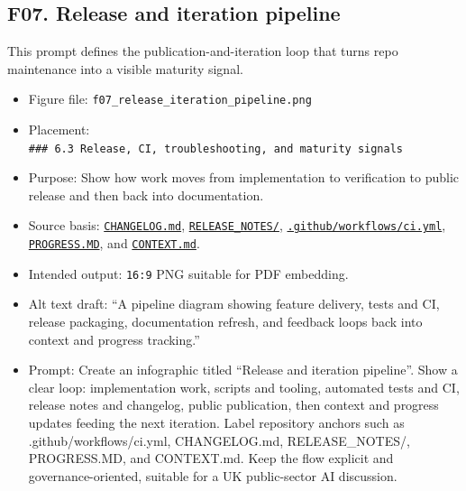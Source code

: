 \subsection{F07. Release and iteration
pipeline}\label{f07.-release-and-iteration-pipeline}

This prompt defines the publication-and-iteration loop that turns repo
maintenance into a visible maturity signal.

\begin{itemize}
\tightlist
\item
  Figure file: \texttt{f07\_release\_iteration\_pipeline.png}
\item
  Placement:
  \texttt{\#\#\#\ 6.3\ Release,\ CI,\ troubleshooting,\ and\ maturity\ signals}
\item
  Purpose: Show how work moves from implementation to verification to
  public release and then back into documentation.
\item
  Source basis:
  \href{https://github.com/chris-page-gov/mcp-geo/blob/fe862910da246ca77f374cfbe484985f5df4d316/CHANGELOG.md}{\texttt{CHANGELOG.md}},
  \href{https://github.com/chris-page-gov/mcp-geo/tree/fe862910da246ca77f374cfbe484985f5df4d316/RELEASE_NOTES}{\texttt{RELEASE\_NOTES/}},
  \href{https://github.com/chris-page-gov/mcp-geo/blob/fe862910da246ca77f374cfbe484985f5df4d316/.github/workflows/ci.yml}{\texttt{.github/workflows/ci.yml}},
  \href{https://github.com/chris-page-gov/mcp-geo/blob/fe862910da246ca77f374cfbe484985f5df4d316/PROGRESS.MD}{\texttt{PROGRESS.MD}},
  and
  \href{https://github.com/chris-page-gov/mcp-geo/blob/fe862910da246ca77f374cfbe484985f5df4d316/CONTEXT.md}{\texttt{CONTEXT.md}}.
\item
  Intended output: \texttt{16:9} PNG suitable for PDF embedding.
\item
  Alt text draft: ``A pipeline diagram showing feature delivery, tests
  and CI, release packaging, documentation refresh, and feedback loops
  back into context and progress tracking.''
\item
  Prompt: Create an infographic titled ``Release and iteration
  pipeline''. Show a clear loop: implementation work, scripts and
  tooling, automated tests and CI, release notes and changelog, public
  publication, then context and progress updates feeding the next
  iteration. Label repository anchors such as .github/workflows/ci.yml,
  CHANGELOG.md, RELEASE\_NOTES/, PROGRESS.MD, and CONTEXT.md. Keep the
  flow explicit and governance-oriented, suitable for a UK public-sector
  AI discussion.
\end{itemize}

